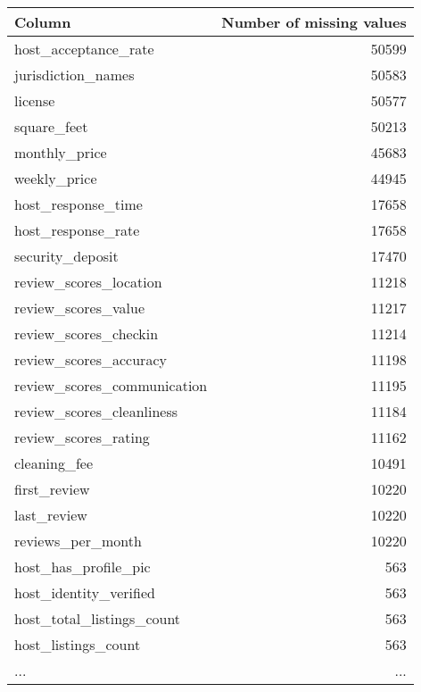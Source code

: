 

\begin{tabular}{lr}
\toprule
\textbf{Column} & \textbf{Number of missing values}\\
\midrule
host\_acceptance\_rate                         &  50599 \\
jurisdiction\_names                           &  50583 \\
license                                      &  50577 \\
square\_feet                                  &  50213 \\
monthly\_price                                &  45683 \\
weekly\_price                                 &  44945 \\
host\_response\_time                           &  17658 \\
host\_response\_rate                           &  17658 \\
security\_deposit                             &  17470 \\
review\_scores\_location                       &  11218 \\
review\_scores\_value                          &  11217 \\
review\_scores\_checkin                        &  11214 \\
review\_scores\_accuracy                       &  11198 \\
review\_scores\_communication                  &  11195 \\
review\_scores\_cleanliness                    &  11184 \\
review\_scores\_rating                         &  11162 \\
cleaning\_fee                                 &  10491 \\
first\_review                                 &  10220 \\
last\_review                                  &  10220 \\
reviews\_per\_month                            &  10220 \\
host\_has\_profile\_pic                         &    563 \\
host\_identity\_verified                       &    563 \\
host\_total\_listings\_count                    &    563 \\
host\_listings\_count                          &    563 \\
... & ...\\

\end{tabular}
